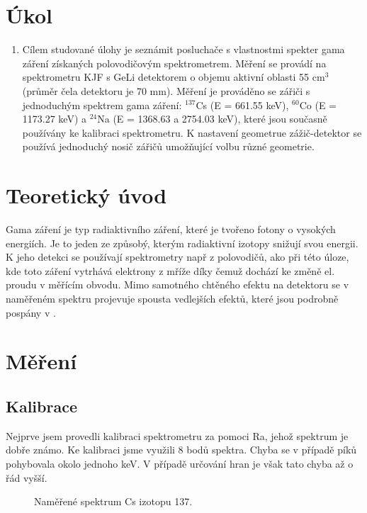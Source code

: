 \documentclass[a4paper,12pt]{article}
\begin{document}
\section{Úkol}
\begin{enumerate}
    \item Cílem studované úlohy je seznámit posluchače s vlastnostmi spekter gama záření získaných polovodičovým spektrometrem.
    Měření se provádí na spektrometru KJF s GeLi detektorem o objemu aktivní oblasti 55 cm$^3$ (průměr čela detektoru je 70 mm). 
    Měření je prováděno se zářiči s jednoduchým spektrem gama záření: $^{137}$Cs (E = 661.55 keV), $^{60}$Co (E = 1173.27 keV) a 
    $^{24}$Na (E = 1368.63 a 2754.03 keV), které jsou současně používány ke kalibraci spektrometru. K nastavení geometrue zážič-detektor 
    se používá jednoduchý nosič zářičů umožňující volbu různé geometrie.
\end{enumerate}

\section{Teoretický úvod}
Gama záření je typ radiaktivního záření, které je tvořeno fotony o vysokých energiích. Je to jeden ze způsobý, kterým radiaktivní izotopy snižují svou energii. K jeho detekci se používají spektrometry např z polovodičů, ako při této úloze, kde toto záření vytrhává elektrony z mříže díky čemuž dochází ke změně el. proudu v měřícím obvodu. Mimo samotného chtěného efektu na detektoru se v naměřeném spektru projevuje spousta vedlejších efektů, které jsou podrobně pospány v \cite{text}.

\section{Měření}
\subsection{Kalibrace}
Nejprve jsem provedli kalibraci spektrometru za pomoci Ra, jehož spektrum je dobře známo.
Ke kalibraci jsme využili 8 bodů spektra. Chyba se v případě píků pohybovala okolo jednoho keV. 
V případě určování hran je však tato chyba až o řád vyšší.

\begin{figure}
\begin{center}

\end{center}
\caption{Naměřené spektrum Cs izotopu 137.}
\label{spect1}
\end{figure}
\end{document}
